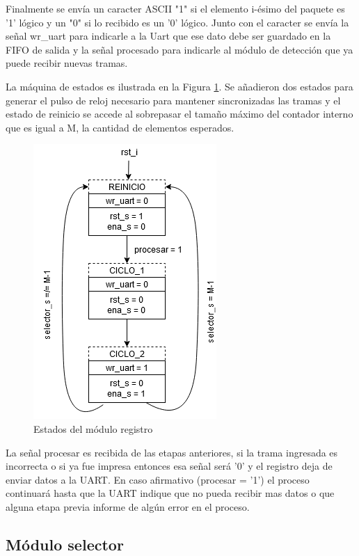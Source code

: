 		Finalmente se envía un caracter ASCII "1" si el elemento i-ésimo del paquete es '1' lógico y un "0" si lo recibido es un '0' lógico. Junto con el caracter se envía la señal wr\_uart para indicarle a la Uart que ese dato debe ser guardado en la FIFO de salida y la señal procesado para indicarle al módulo de detección que ya puede recibir nuevas tramas.
	
		La máquina de estados es ilustrada en la Figura \ref{fig:Estado_Registro}. Se añadieron dos estados para generar el pulso de reloj necesario para mantener sincronizadas las tramas y el estado de reinicio se accede al sobrepasar el tamaño máximo del contador interno que es igual a M, la cantidad de elementos esperados.
		
		\begin{figure}[h]
		\centering
			\includegraphics[scale=.9, angle = -90]{./Figures/Estados-Registro}
			\caption{Estados del módulo registro}
			\label{fig:Estado_Registro}
		\end{figure}
		
		
		La señal procesar es recibida de las etapas anteriores, si la trama ingresada es incorrecta o si ya fue impresa entonces esa señal será '0' y el registro deja de enviar datos a la UART. En caso afirmativo (procesar = '1') el proceso continuará hasta que la UART indique que no pueda recibir mas datos o que alguna etapa previa informe de algún error en el proceso.
		
	\subsection{Módulo selector}
	
